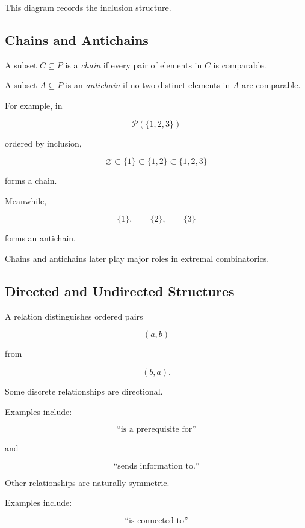 This diagram records the inclusion structure.

\subsection{Chains and Antichains}
\label{subsec:chains-antichains-discrete}

A subset \(C\subseteq P\) is a \emph{chain} if every pair of elements
in \(C\) is comparable.

A subset \(A\subseteq P\) is an \emph{antichain} if no two distinct
elements in \(A\) are comparable.

For example, in

\[
\mathcal{P}(\{1,2,3\})
\]

ordered by inclusion,

\[
\varnothing
\subset
\{1\}
\subset
\{1,2\}
\subset
\{1,2,3\}
\]

forms a chain.

Meanwhile,

\[
\{1\},
\qquad
\{2\},
\qquad
\{3\}
\]

forms an antichain.

Chains and antichains later play major roles in extremal combinatorics.

\subsection{Directed and Undirected Structures}
\label{subsec:directed-undirected-structures}

A relation distinguishes ordered pairs

\[
(a,b)
\]

from

\[
(b,a).
\]

Some discrete relationships are directional.

Examples include:

\[
\text{``is a prerequisite for''}
\]

and

\[
\text{``sends information to.''}
\]

Other relationships are naturally symmetric.

Examples include:

\[
\text{``is connected to''}
\]

